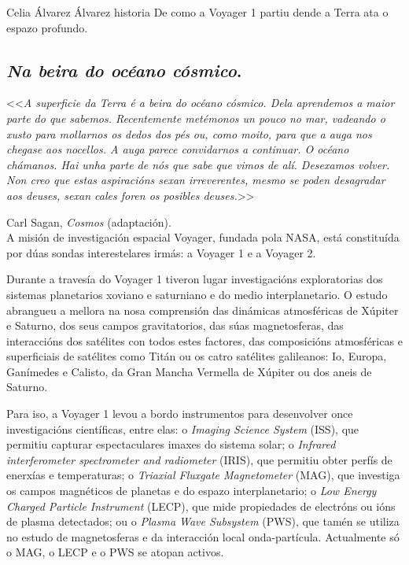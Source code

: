 \Titular*%
{Viaxeiros espaciais. Oda á Voyager 1.}%
{Celia Álvarez Álvarez}%
{historia}%
{De como a Voyager 1 partiu dende a Terra ata o espazo profundo.}%

\begin{refsection}
\begin{multicols}{2}

\subsection*{\textit{Na beira do océano cósmico}.}

<<\textit{A superficie da Terra é a beira do océano cósmico. Dela aprendemos a
maior parte do que sabemos. Recentemente metémonos un pouco no mar, vadeando o
xusto para mollarnos os dedos dos pés ou, como moito, para que a auga nos
chegase aos nocellos. A auga parece convidarnos a continuar. O océano chámanos.
Hai unha parte de nós que sabe que vimos de alí. Desexamos volver. Non creo que
estas aspiracións sexan irreverentes, mesmo se poden desagradar aos deuses,
sexan cales foren os posibles deuses.}>> 

\hfill Carl Sagan, \textit{Cosmos} (adaptación). \\

A misión de investigación espacial Voyager, fundada pola NASA, está constituída
por dúas sondas interestelares irmás: a Voyager 1 e a Voyager 2.

Durante a travesía do Voyager 1 tiveron lugar investigacións exploratorias dos
sistemas planetarios xoviano e saturniano e do medio interplanetario. O estudo
abrangueu a mellora na nosa comprensión das dinámicas atmosféricas de Xúpiter e
Saturno, dos seus campos gravitatorios, das súas magnetosferas, das
interaccións dos satélites con todos estes factores, das composicións
atmosféricas e superficiais de satélites como Titán ou os catro satélites
galileanos: Io, Europa, Ganímedes e Calisto, da Gran Mancha Vermella de Xúpiter
ou dos aneis de Saturno.

Para iso, a Voyager 1 levou a bordo instrumentos para desenvolver once
investigacións científicas, entre elas: o \textit{Imaging Science System}
(ISS), que permitiu capturar espectaculares imaxes do sistema solar; o
\textit{Infrared interferometer spectrometer and radiometer} (IRIS), que
permitiu obter perfís de enerxías e temperaturas; o \textit{Triaxial Fluxgate
Magnetometer} (MAG), que investiga os campos magnéticos de planetas e do espazo
interplanetario; o \textit{Low Energy Charged Particle Instrument} (LECP), que
mide propiedades de electróns ou ións de plasma detectados; ou o \textit{Plasma
Wave Subsystem} (PWS), que tamén se utiliza no estudo de magnetosferas e da
interacción local onda-partícula. Actualmente só o MAG, o LECP e o PWS se
atopan activos.


\end{multicols}
\end{refsection}

